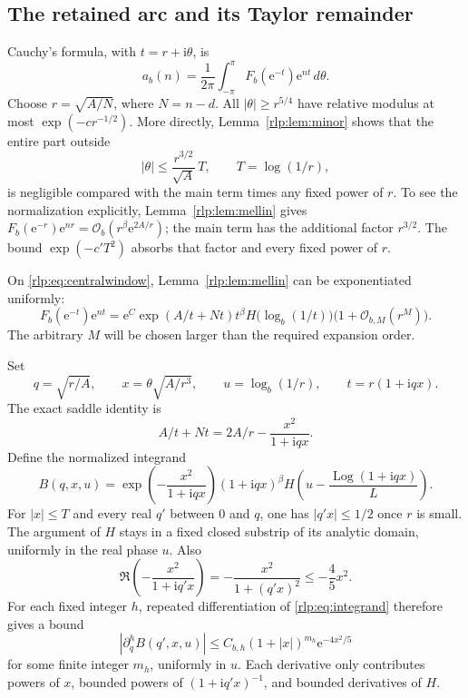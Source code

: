 \documentclass[11pt,letterpaper]{article}
\numberwithin{equation}{section}
\theoremstyle{remark}\newtheorem{remark}[theorem]{Remark}
\newcommand{\ii}{\mathrm i}
\newcommand{\ee}{\mathrm e}
\newcommand{\Ord}{\mathcal O}
\newcommand{\Log}{\operatorname{Log}}
\begin{document}
\subsection{The retained arc and its Taylor remainder}
Cauchy's formula, with $t=r+\ii\theta$, is
\begin{equation}\label{rlp:eq:cauchy}
 a_b(n)=\frac1{2\pi}\int_{-\pi}^{\pi}
 F_b(\ee^{-t})\ee^{nt}\,d\theta.
\end{equation}
Choose $r=\sqrt{A/N}$, where $N=n-d$. All $|\theta|\ge r^{5/4}$ have relative modulus at most $\exp(-c r^{-1/2})$. More directly, Lemma~\ref{rlp:lem:minor} shows that the entire part outside
\begin{equation}\label{rlp:eq:centralwindow}
 |\theta|\le \frac{r^{3/2}}{\sqrt A}\,T,
 \qquad T=\log(1/r),
\end{equation}
is negligible compared with the main term times any fixed power of $r$. To see the normalization explicitly, Lemma~\ref{rlp:lem:mellin} gives
$F_b(\ee^{-r})\ee^{nr}=\Ord_b(r^\beta\ee^{2A/r})$; the main term has the additional factor $r^{3/2}$. The bound $\exp(-c' T^2)$ absorbs that factor and every fixed power of $r$.

On \eqref{rlp:eq:centralwindow}, Lemma~\ref{rlp:lem:mellin} can be exponentiated uniformly:
\begin{equation}\label{rlp:eq:localform}
 F_b(\ee^{-t})\ee^{nt}
 =\ee^C\exp(A/t+Nt)t^\beta
 H\bigl(\log_b(1/t)\bigr)\bigl(1+\Ord_{b,M}(r^M)\bigr).
\end{equation}
The arbitrary $M$ will be chosen larger than the required expansion order.

Set
\[
 q=\sqrt{r/A},\qquad x=\theta\sqrt{A/r^3},\qquad
 u=\log_b(1/r),\qquad t=r(1+\ii qx).
\]
The exact saddle identity is
\begin{equation}\label{rlp:eq:exactphase}
 A/t+Nt=2A/r-\frac{x^2}{1+\ii qx}.
\end{equation}
Define the normalized integrand
\begin{equation}\label{rlp:eq:integrand}
 B(q,x,u)=
 \exp\left(-\frac{x^2}{1+\ii qx}\right)
 (1+\ii qx)^\beta
 H\left(u-\frac{\Log(1+\ii qx)}L\right).
\end{equation}
For $|x|\le T$ and every real $q'$ between $0$ and $q$, one has $|q'x|\le1/2$ once $r$ is small. The argument of $H$ stays in a fixed closed substrip of its analytic domain, uniformly in the real phase $u$. Also
\[
 \Re\left(-\frac{x^2}{1+\ii q'x}\right)
 =-\frac{x^2}{1+(q'x)^2}\le-\frac45x^2.
\]
For each fixed integer $h$, repeated differentiation of \eqref{rlp:eq:integrand} therefore gives a bound
\begin{equation}\label{rlp:eq:taylorbound}
 |\partial_q^h B(q',x,u)|
 \le C_{b,h}(1+|x|)^{m_h}\ee^{-4x^2/5}
\end{equation}
for some finite integer $m_h$, uniformly in $u$. Each derivative only contributes powers of $x$, bounded powers of $(1+\ii q'x)^{-1}$, and bounded derivatives of $H$.
\end{document}
